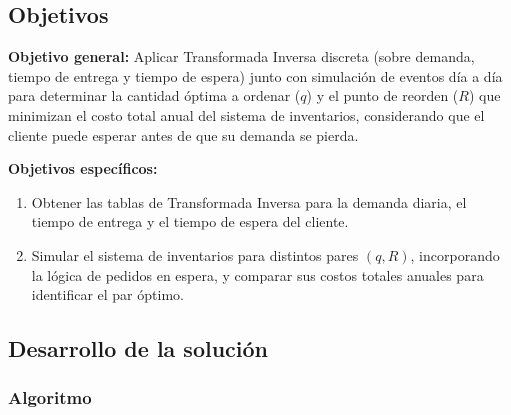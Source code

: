 \subsection{Objetivos}

\textbf{Objetivo general:} Aplicar Transformada Inversa discreta (sobre demanda, tiempo de entrega y tiempo de espera) junto con simulación de eventos día a día para determinar la cantidad óptima a ordenar ($q$) y el punto de reorden ($R$) que minimizan el costo total anual del sistema de inventarios, considerando que el cliente puede esperar antes de que su demanda se pierda.

\textbf{Objetivos específicos:}
\begin{enumerate}
    \item Obtener las tablas de Transformada Inversa para la demanda diaria, el tiempo de entrega y el tiempo de espera del cliente.
    \item Simular el sistema de inventarios para distintos pares $(q, R)$, incorporando la lógica de pedidos en espera, y comparar sus costos totales anuales para identificar el par óptimo.
\end{enumerate}

\subsection{Desarrollo de la solución}

\subsubsection{Algoritmo}

